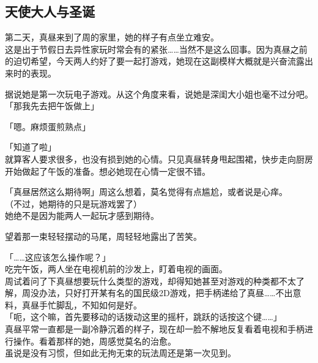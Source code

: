 \subsection{天使大人与圣诞}

第二天，真昼来到了周的家里，她的样子有点坐立难安。\\

这是出于节假日去异性家玩时常会有的紧张……当然不是这么回事。因为真昼之前的迫切希望，今天两人约好了要一起打游戏，她现在这副模样大概就是兴奋流露出来时的表现。

据说她是第一次玩电子游戏。从这个角度来看，说她是深闺大小姐也毫不过分吧。\\

「那我先去把午饭做上」

「嗯。麻烦蛋煎熟点」

「知道了啦」\\

就算客人要求很多，也没有损到她的心情。只见真昼转身甩起围裙，快步走向厨房开始做起了午饭的准备。想必她现在心情一定很不错。

「真昼居然这么期待啊」周这么想着，莫名觉得有点尴尬，或者说是心痒。\\

（不过，她期待的只是玩游戏罢了）\\

她绝不是因为能两人一起玩才感到期待。

望着那一束轻轻摆动的马尾，周轻轻地露出了苦笑。\\

\vspace{2\baselineskip}

「……这应该怎么操作呢？」\\

吃完午饭，两人坐在电视机前的沙发上，盯着电视的画面。\\

周试着问了下真昼想要玩什么类型的游戏，却得知她甚至对游戏的种类都不太了解，周没办法，只好打开某有名的国民级2D游戏，把手柄递给了真昼……不出意料，真昼手忙脚乱，不知如何是好。\\

「呃，这个嘛，首先要移动的话拨动这里的摇杆，跳跃的话按这个键……」\\

真昼平常一直都是一副冷静沉着的样子，现在却一脸不解地反复看着电视和手柄进行操作。看着那样的她，周感觉莫名的治愈。\\

虽说是没有习惯，但如此无拘无束的玩法周还是第一次见到。\\

